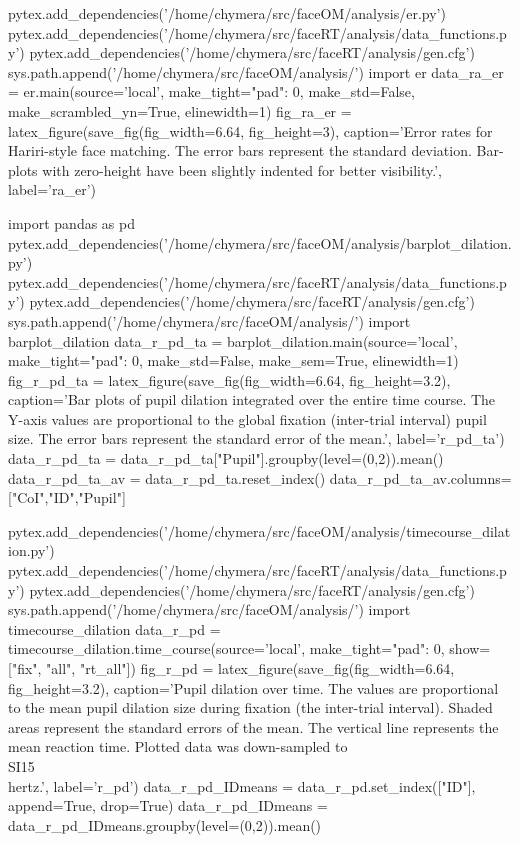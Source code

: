 \begin{pycode}[ra_er]
pytex.add_dependencies('/home/chymera/src/faceOM/analysis/er.py')
pytex.add_dependencies('/home/chymera/src/faceRT/analysis/data_functions.py')
pytex.add_dependencies('/home/chymera/src/faceRT/analysis/gen.cfg')
sys.path.append('/home/chymera/src/faceOM/analysis/')
import er
data_ra_er = er.main(source='local', make_tight={"pad": 0}, make_std=False, make_scrambled_yn=True, elinewidth=1)
fig_ra_er = latex_figure(save_fig(fig_width=6.64, fig_height=3), caption='Error rates for Hariri-style face matching. The error bars represent the standard deviation. Bar-plots with zero-height have been slightly indented for better visibility.', label='ra_er')
\end{pycode}
\begin{pycode}[r_pd_ta]
import pandas as pd
pytex.add_dependencies('/home/chymera/src/faceOM/analysis/barplot_dilation.py')
pytex.add_dependencies('/home/chymera/src/faceRT/analysis/data_functions.py')
pytex.add_dependencies('/home/chymera/src/faceRT/analysis/gen.cfg')
sys.path.append('/home/chymera/src/faceOM/analysis/')
import barplot_dilation
data_r_pd_ta = barplot_dilation.main(source='local', make_tight={"pad": 0}, make_std=False, make_sem=True, elinewidth=1)
fig_r_pd_ta = latex_figure(save_fig(fig_width=6.64, fig_height=3.2), caption='Bar plots of pupil dilation integrated over the entire time course. The Y-axis values are proportional to the global fixation (inter-trial interval) pupil size. The error bars represent the standard error of the mean.', label='r_pd_ta')
data_r_pd_ta = data_r_pd_ta["Pupil"].groupby(level=(0,2)).mean()
data_r_pd_ta_av = data_r_pd_ta.reset_index()
data_r_pd_ta_av.columns=["CoI","ID","Pupil"]
\end{pycode}
\begin{pycode}[r_pd]
pytex.add_dependencies('/home/chymera/src/faceOM/analysis/timecourse_dilation.py')
pytex.add_dependencies('/home/chymera/src/faceRT/analysis/data_functions.py')
pytex.add_dependencies('/home/chymera/src/faceRT/analysis/gen.cfg')
sys.path.append('/home/chymera/src/faceOM/analysis/')
import timecourse_dilation
data_r_pd = timecourse_dilation.time_course(source='local', make_tight={"pad": 0}, show=["fix", "all", "rt_all"])
fig_r_pd = latex_figure(save_fig(fig_width=6.64, fig_height=3.2), caption='Pupil dilation over time. The values are proportional to the mean pupil dilation size during fixation (the inter-trial interval). Shaded areas represent the standard errors of the mean. The vertical line represents the mean reaction time. Plotted data was down-sampled to \\SI{15}{\\hertz}.', label='r_pd')
data_r_pd_IDmeans = data_r_pd.set_index(["ID"], append=True, drop=True)
data_r_pd_IDmeans = data_r_pd_IDmeans.groupby(level=(0,2)).mean()
\end{pycode}
